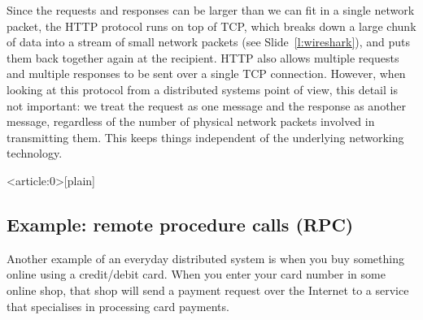 Since the requests and responses can be larger than we can fit in a single network packet, the HTTP protocol runs on top of TCP, which breaks down a large chunk of data into a stream of small network packets (see Slide~\ref{l:wireshark}), and puts them back together again at the recipient.
HTTP also allows multiple requests and multiple responses to be sent over a single TCP connection.
However, when looking at this protocol from a distributed systems point of view, this detail is not important: we treat the request as one message and the response as another message, regardless of the number of physical network packets involved in transmitting them.
This keeps things independent of the underlying networking technology.

\begin{frame}<article:0>[plain]
    \label{s:wireshark}
\end{frame}
\label{l:wireshark}

\subsection{Example: remote procedure calls (RPC)}

Another example of an everyday distributed system is when you buy something online using a credit/debit card.
When you enter your card number in some online shop, that shop will send a payment request over the Internet to a service that specialises in processing card payments.

